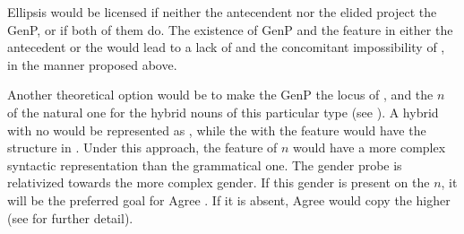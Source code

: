 \documentclass[output=paper,modfonts,newtxmath,hidelinks]{langscibook}
\begin{document}
\noindent Ellipsis would be licensed if neither the antecendent nor the elided  project the GenP, or if both of them do. The existence of GenP and the  feature in either the antecedent or the  would lead to a lack of  and the concomitant impossibility of , in the manner proposed above.
			
			Another theoretical option would be to make the GenP the locus of , and the $n$ of the natural one for the hybrid nouns of this particular type (see \citealt{puskar17,puskarhybrid17}). A hybrid  with no  would be represented as , while the  with the  feature would have the structure in . Under this approach, the  feature of $n$ would have a more complex syntactic representation than the grammatical one. The gender probe is relativized towards the more complex gender. If this gender is present on the $n$, it will be the preferred goal for Agree . If it is absent, Agree would copy the higher   (see \citealt{puskar17} for further detail).  
			
\end{document}
